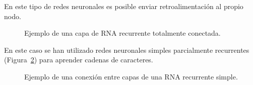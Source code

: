 \documentclass[
  us-letterpaper,
]{scrreprt}
\theoremstyle{plain}
\theoremstyle{definition}
\theoremstyle{definition}
\theoremstyle{remark}
\begin{document}
En este tipo de redes neuronales es posible enviar retroalimentación al
propio nodo.

\begin{figure}


\caption{\label{fig-Recurrente1}Ejemplo de una capa de RNA recurrente
totalmente conectada.}

\end{figure}%

En este caso se han utilizado redes neuronales simples parcialmente
recurrentes (Figura~\ref{fig-Recurrente2}) para aprender cadenas de
caracteres.

\begin{figure}


\caption{\label{fig-Recurrente2}Ejemplo de una conexión entre capas de
una RNA recurrente simple.}

\end{figure}%
\end{document}
